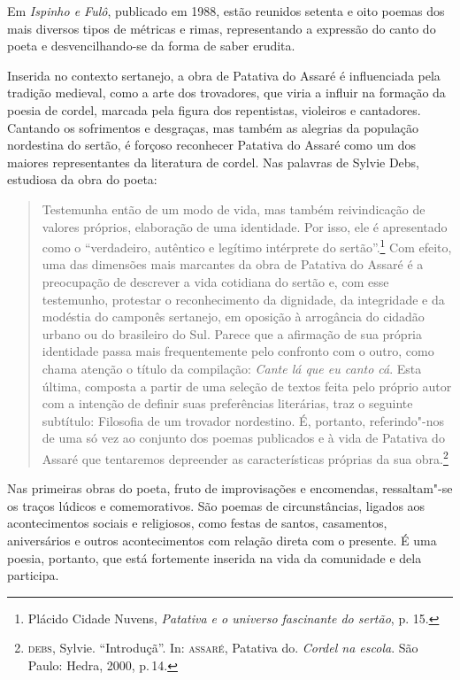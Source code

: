 Em \emph{Ispinho e Fulô}, publicado em 1988, estão reunidos setenta e oito poemas dos mais
diversos tipos de métricas e rimas, representando a expressão do canto
do poeta e desvencilhando-se da forma de saber erudita.

Inserida no contexto sertanejo, a obra de Patativa do Assaré é influenciada pela tradição medieval, como a arte dos trovadores, que viria a influir na formação da poesia de cordel, marcada pela figura dos repentistas, violeiros e cantadores.
Cantando os sofrimentos e desgraças, mas também as alegrias da população nordestina do sertão, é forçoso reconhecer Patativa do Assaré como um dos maiores representantes da literatura de cordel. Nas palavras de Sylvie Debs, estudiosa da obra do poeta:

\begin{quote}
Testemunha então de um modo de vida, mas também reivindicação de valores
próprios, elaboração de uma identidade. Por isso, ele é apresentado como o
“verdadeiro, autêntico e legítimo intérprete do sertão”.\footnote{ Plácido Cidade
Nuvens, \textit{Patativa e o universo fascinante do sertão}, p. 15.} Com
efeito, uma das dimensões mais marcantes da obra de Patativa do Assaré é a
preocupação de descrever a vida cotidiana do sertão e, com esse testemunho,
protestar o reconhecimento da dignidade, da integridade e da modéstia do
camponês sertanejo, em oposição à arrogância do cidadão urbano ou do brasileiro
do Sul. Parece que a afirmação de sua própria identidade passa mais
frequentemente pelo confronto com o outro, como chama atenção o título da
compilação: \textit{Cante lá que eu canto cá}. Esta última, composta a partir de uma
seleção de textos feita pelo próprio autor com a intenção de definir suas
preferências literárias, traz o seguinte subtítulo: Filosofia de um trovador
nordestino. É, portanto, referindo"-nos de uma só vez ao conjunto dos poemas
publicados e à vida de Patativa do Assaré que tentaremos depreender as
características próprias da sua obra.\footnote{\textsc{debs}, Sylvie. ``Introduçã''. In: \textsc{assaré}, Patativa do. \textit{Cordel na escola}. São Paulo: Hedra, 2000, p.\,14.}
\end{quote}

Nas primeiras obras do poeta, fruto de improvisações e encomendas, ressaltam"-se os traços lúdicos e comemorativos. São poemas de circunstâncias, ligados aos acontecimentos sociais e religiosos, como festas de santos, casamentos, aniversários e outros acontecimentos com relação direta com o presente.
É uma poesia, portanto, que está fortemente inserida na vida da comunidade e dela participa.

